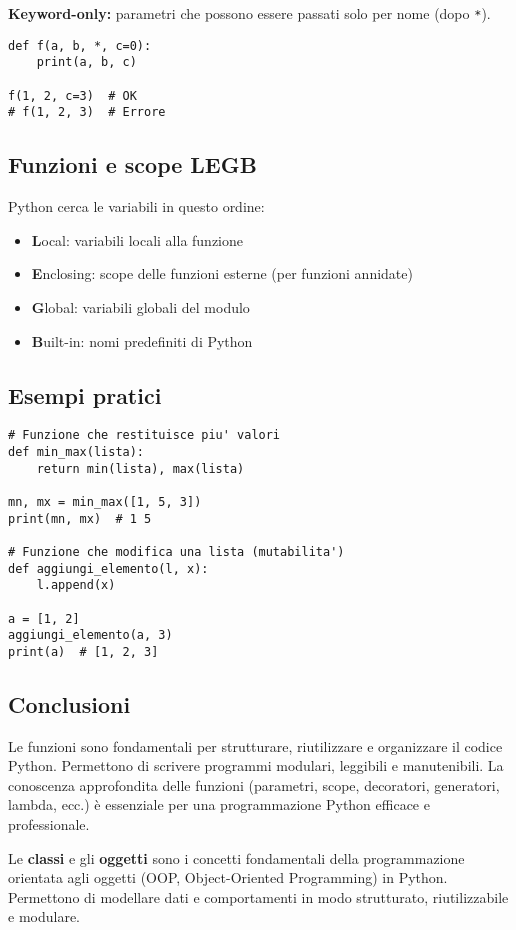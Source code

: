 \documentclass[a4paper,12pt]{article}
\begin{document}
\textbf{Keyword-only:} parametri che possono essere passati solo per nome (dopo \texttt{*}).

\begin{lstlisting}
def f(a, b, *, c=0):
    print(a, b, c)

f(1, 2, c=3)  # OK
# f(1, 2, 3)  # Errore
\end{lstlisting}

\subsection*{Funzioni e scope LEGB}
Python cerca le variabili in questo ordine:
\begin{itemize}
    \item \textbf{L}ocal: variabili locali alla funzione
    \item \textbf{E}nclosing: scope delle funzioni esterne (per funzioni annidate)
    \item \textbf{G}lobal: variabili globali del modulo
    \item \textbf{B}uilt-in: nomi predefiniti di Python
\end{itemize}

\subsection*{Esempi pratici}
\begin{lstlisting}
# Funzione che restituisce piu' valori
def min_max(lista):
    return min(lista), max(lista)

mn, mx = min_max([1, 5, 3])
print(mn, mx)  # 1 5

# Funzione che modifica una lista (mutabilita')
def aggiungi_elemento(l, x):
    l.append(x)

a = [1, 2]
aggiungi_elemento(a, 3)
print(a)  # [1, 2, 3]
\end{lstlisting}

\subsection*{Conclusioni}
Le funzioni sono fondamentali per strutturare, riutilizzare e organizzare il codice Python. Permettono di scrivere programmi modulari, leggibili e manutenibili. La conoscenza approfondita delle funzioni (parametri, scope, decoratori, generatori, lambda, ecc.) è essenziale per una programmazione Python efficace e professionale.

Le \textbf{classi} e gli \textbf{oggetti} sono i concetti fondamentali della programmazione orientata agli oggetti (OOP, Object-Oriented Programming) in Python. Permettono di modellare dati e comportamenti in modo strutturato, riutilizzabile e modulare.
\end{document}
